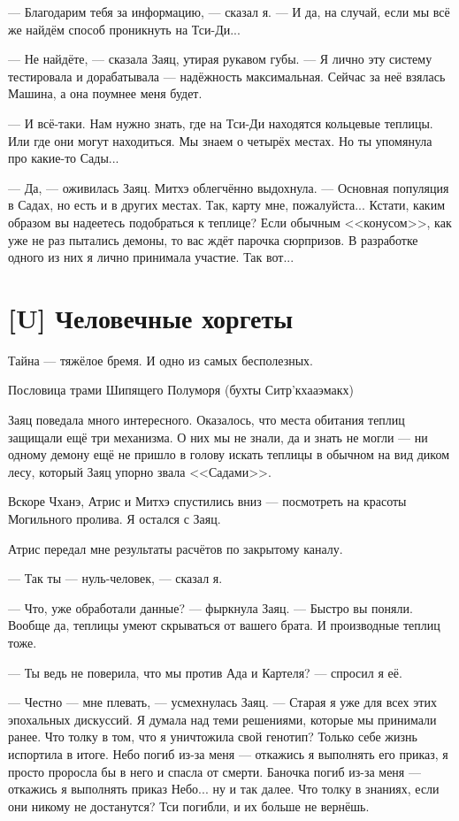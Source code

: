 --- Благодарим тебя за информацию, --- сказал я.
--- И да, на случай, если мы всё же найдём способ проникнуть на Тси-Ди...

--- Не найдёте, --- сказала Заяц, утирая рукавом губы.
--- Я лично эту систему тестировала и дорабатывала --- надёжность максимальная.
Сейчас за неё взялась Машина, а она поумнее меня будет.

--- И всё-таки.
Нам нужно знать, где на Тси-Ди находятся кольцевые теплицы.
Или где они могут находиться.
Мы знаем о четырёх местах.
Но ты упомянула про какие-то Сады...

--- Да, --- оживилась Заяц.
Митхэ облегчённо выдохнула.
--- Основная популяция в Садах, но есть и в других местах.
Так, карту мне, пожалуйста...
Кстати, каким образом вы надеетесь подобраться к теплице?
Если обычным <<конусом>>, как уже не раз пытались демоны, то вас ждёт парочка сюрпризов.
В разработке одного из них я лично принимала участие.
Так вот...

\section{[U] Человечные хоргеты}

\epigraph
{Тайна --- тяжёлое бремя.
И одно из самых бесполезных.}
{Пословица трами Шипящего Полуморя (бухты Ситр'кхааэмакх)}

Заяц поведала много интересного.
Оказалось, что места обитания теплиц защищали ещё три механизма.
О них мы не знали, да и знать не могли --- ни одному демону ещё не пришло в голову искать теплицы в обычном на вид диком лесу, который Заяц упорно звала <<Садами>>.

Вскоре Чханэ, Атрис и Митхэ спустились вниз --- посмотреть на красоты Могильного пролива.
Я остался с Заяц.

Атрис передал мне результаты расчётов по закрытому каналу.

--- Так ты --- нуль-человек, --- сказал я.

--- Что, уже обработали данные? --- фыркнула Заяц.
--- Быстро вы поняли.
Вообще да, теплицы умеют скрываться от вашего брата.
И производные теплиц тоже.

--- Ты ведь не поверила, что мы против Ада и Картеля? --- спросил я её.

--- Честно --- мне плевать, --- усмехнулась Заяц.
--- Старая я уже для всех этих эпохальных дискуссий.
Я думала над теми решениями, которые мы принимали ранее.
Что толку в том, что я уничтожила свой генотип?
Только себе жизнь испортила в итоге.
Небо погиб из-за меня --- откажись я выполнять его приказ, я просто проросла бы в него и спасла от смерти.
Баночка погиб из-за меня --- откажись я выполнять приказ Небо... ну и так далее.
Что толку в знаниях, если они никому не достанутся?
Тси погибли, и их больше не вернёшь.

